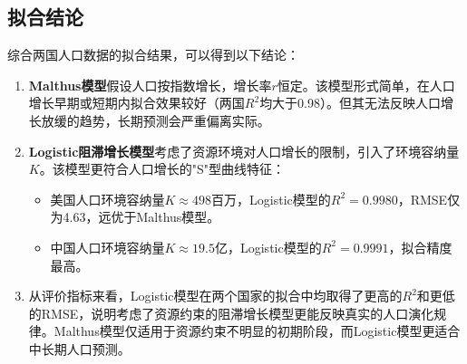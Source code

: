 \documentclass{article}
\begin{document}
	\subsection{拟合结论}
	
	综合两国人口数据的拟合结果，可以得到以下结论：
	
	\begin{enumerate}
		\item \textbf{Malthus模型}假设人口按指数增长，增长率\(r\)恒定。该模型形式简单，在人口增长早期或短期内拟合效果较好（两国\(R^2\)均大于0.98）。但其无法反映人口增长放缓的趋势，长期预测会严重偏离实际。
		
		\item \textbf{Logistic阻滞增长模型}考虑了资源环境对人口增长的限制，引入了环境容纳量\(K\)。该模型更符合人口增长的"S"型曲线特征：
		\begin{itemize}
			\item 美国人口环境容纳量\(K\approx 498\)百万，Logistic模型的\(R^2=0.9980\)，RMSE仅为4.63，远优于Malthus模型。
			\item 中国人口环境容纳量\(K\approx 19.5\)亿，Logistic模型的\(R^2=0.9991\)，拟合精度最高。
		\end{itemize}
		
		\item 从评价指标来看，Logistic模型在两个国家的拟合中均取得了更高的\(R^2\)和更低的RMSE，说明考虑了资源约束的阻滞增长模型更能反映真实的人口演化规律。Malthus模型仅适用于资源约束不明显的初期阶段，而Logistic模型更适合中长期人口预测。
	\end{enumerate}
	
\end{document}
